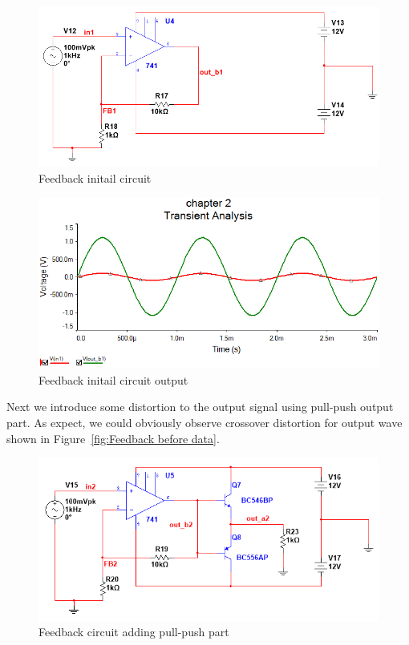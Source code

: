 \begin{figure}[htbp]
	\centering
	\includegraphics[scale=0.65]{"../Photo/Chap2/Feed_back_ini"}
	\caption{Feedback initail circuit  }
	\label{fig:Feedback init}
\end{figure}

\begin{figure}[htbp]
	\centering
	\includegraphics[scale=0.7]{"../Photo/Chap2/Feedback_ini_data"}
	\caption{Feedback initail circuit output}
	\label{fig:Feedback init data}
\end{figure}

Next we introduce some distortion to the output signal using  pull-push output part. As expect, we could obviously observe crossover distortion for output wave shown in Figure~\ref{fig:Feedback before data}.

\begin{figure}[htbp]
	\centering
	\includegraphics[scale=0.7]{"../Photo/Chap2/Feed_back_ini_before"}
	\caption{Feedback circuit adding pull-push part}
	\label{fig:Feedback before}
\end{figure}

